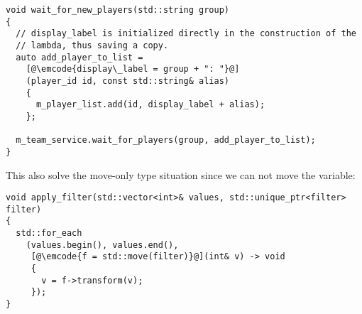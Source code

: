 \begin{lstlisting}
void wait_for_new_players(std::string group)
{
  // display_label is initialized directly in the construction of the
  // lambda, thus saving a copy.
  auto add_player_to_list =
    [@\emcode{display\_label = group + ": "}@]
    (player_id id, const std::string& alias)
    {
      m_player_list.add(id, display_label + alias);
    };

  m_team_service.wait_for_players(group, add_player_to_list);
}
\end{lstlisting}

This also solve the move-only type situation since we can not move the
variable:

\begin{lstlisting}
void apply_filter(std::vector<int>& values, std::unique_ptr<filter> filter)
{
  std::for_each
    (values.begin(), values.end(),
     [@\emcode{f = std::move(filter)}@](int& v) -> void
     {
       v = f->transform(v);
     });
}
\end{lstlisting}
